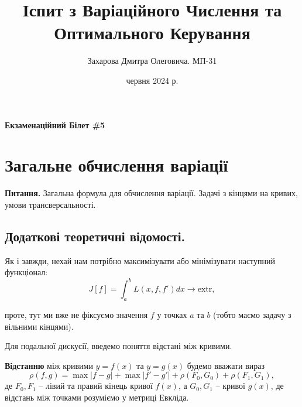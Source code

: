 \documentclass[14pt]{extarticle}
\title{\huge\sffamily\bfseries Іспит з Варіаційного Числення та Оптимального Керування}
\author{\Large\sffamily Захарова Дмитра Олеговича. МП-31}
\date{\sffamily 7 червня 2024 р.}
\newcommand{\<}{\langle}
\renewcommand{\>}{\rangle}
\theoremstyle{mystyle}{\newtheorem{definition}{Definition}[section]}
\theoremstyle{mystyle}{\newtheorem{proposition}[definition]{Proposition}}
\theoremstyle{mystyle}{\newtheorem{theorem}[definition]{Theorem}}
\theoremstyle{mystyle}{\newtheorem{lemma}[definition]{Lemma}}
\theoremstyle{mystyle}{\newtheorem{corollary}[definition]{Corollary}}
\theoremstyle{mystyle}{\newtheorem*{remark}{Remark}}
\theoremstyle{mystyle}{\newtheorem*{remarks}{Remarks}}
\theoremstyle{mystyle}{\newtheorem*{example}{Example}}
\theoremstyle{mystyle}{\newtheorem*{examples}{Examples}}
\theoremstyle{definition}{\newtheorem*{exercise}{Exercise}}
\theoremstyle{cstyle}{\newtheorem*{cthm}{}}
\theoremstyle{warn}
\begin{document}
\maketitle


\begin{center}
    \textbf{Екзаменаційний Білет \#5}
\end{center}

\begin{tcolorbox}[title=Вміст, fonttitle=\sffamily\bfseries\selectfont,interior style={left color=contcol1!40!white,right color=contcol2!40!white},frame style={left color=contcol1!80!white,right color=contcol2!80!white},coltitle=black,top=2mm,bottom=2mm,left=2mm,right=2mm,drop fuzzy shadow,enhanced,breakable]
\makeatletter
{}
\makeatother
\end{tcolorbox}

\newpage

\section{Загальне обчислення варіації}

\textbf{Питання.} Загальна формула для обчислення варіації. Задачі з кінцями на кривих, умови трансверсальності.

\subsection{Додаткові теоретичні відомості.}

Як і завжди, нехай нам потрібно максимізувати або мінімізувати наступний функціонал:
\begin{equation}
    J[f] = \int_a^b L(x,f,f')dx \to \text{extr},
\end{equation}

проте, тут ми вже не фіксуємо значення $f$ у точках $a$ та $b$ (тобто маємо задачу з вільними кінцями).

Для подальної дискусії, введемо поняття відстані між кривими.

\begin{definition}
    \textbf{Відстанню} між кривими $y=f(x)$ та $y=g(x)$ будемо вважати вираз 
    \begin{equation}
        \rho(f,g) = \max |f-g| + \max |f'-g'|+ \rho(F_0,G_0) + \rho(F_1,G_1),
    \end{equation}
    де $F_0,F_1$ -- лівий та правий кінець кривої $f(x)$, а $G_0,G_1$ -- кривої $g(x)$, де відстань між 
    точками розуміємо у метриці Евкліда.
\end{definition}
\end{document}
